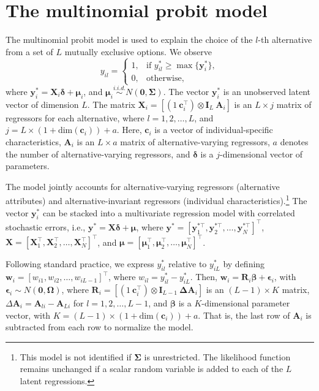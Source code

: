 \section{The multinomial probit model}\label{sec64}

The multinomial probit model is used to explain the choice of the $l$-th alternative from a set of $L$ mutually exclusive options. We observe
\begin{equation*}
	y_{il} =
	\begin{cases}
		1, & \text{if } y_{il}^* \geq \max\{\bm{y}_i^*\}, \\
		0, & \text{otherwise,}
	\end{cases}
\end{equation*}
where $\bm{y}_i^* = \bm{X}_{i}\bm{\delta} + \bm{\mu}_i$, and $\bm{\mu}_i \stackrel{i.i.d.}{\sim} N(\bm{0}, \bm{\Sigma})$. The vector $\bm{y}_i^*$ is an unobserved latent vector of dimension $L$. The matrix $\bm{X}_i = \left[(1 \ \bm{c}_i^{\top}) \otimes \bm{I}_L \ \bm{A}_i\right]$ is an $L \times j$ matrix of regressors for each alternative, where $l = 1, 2, \dots, L$, and $j = L \times (1 + \text{dim}(\bm{c}_i)) + a$. Here, $\bm{c}_i$ is a vector of individual-specific characteristics, $\bm{A}_i$ is an $L \times a$ matrix of alternative-varying regressors, $a$ denotes the number of alternative-varying regressors, and $\bm{\delta}$ is a $j$-dimensional vector of parameters.

The model jointly accounts for alternative-varying regressors (alternative attributes) and alternative-invariant regressors (individual characteristics).\footnote{This model is not identified if $\bm{\Sigma}$ is unrestricted. The likelihood function remains unchanged if a scalar random variable is added to each of the $L$ latent regressions.} The vector $\bm{y}_i^*$ can be stacked into a multivariate regression model with correlated stochastic errors, i.e., $\bm{y}^* = \bm{X}\bm{\delta} + \bm{\mu}$, where $\bm{y}^* = [\bm{y}_1^{*\top}, \bm{y}_2^{*\top}, \dots, \bm{y}_N^{*\top}]^{\top}$, $\bm{X} = [\bm{X}_1^{\top}, \bm{X}_2^{\top}, \dots, \bm{X}_N^{\top}]^{\top}$, and $\bm{\mu} = [\bm{\mu}_1^{\top}, \bm{\mu}_2^{\top}, \dots, \bm{\mu}_N^{\top}]^{\top}$.

Following standard practice, we express $y_{il}^*$ relative to $y_{iL}^*$ by defining $\bm{w}_i = [w_{i1}, w_{i2}, \dots, w_{iL-1}]^{\top}$, where $w_{il} = y_{il}^* - y_{iL}^*$. Then, $\bm{w}_i = \bm{R}_i\bm{\beta} + \bm{\epsilon}_i$, with $\bm{\epsilon}_i \sim N(\bm{0}, \bm{\Omega})$, where $\bm{R}_i = \left[(1 \ \bm{c}_i^{\top}) \otimes \bm{I}_{L-1} \ \bm{\Delta A}_i\right]$ is an $(L-1) \times K$ matrix, $\Delta\bm{A}_i = \bm{A}_{li} - \bm{A}_{Li}$ for $l = 1, 2, \dots, L-1$, and $\bm{\beta}$ is a $K$-dimensional parameter vector, with $K = (L-1) \times (1 + \text{dim}(\bm{c}_i)) + a$. That is, the last row of $\bm{A}_i$ is subtracted from each row to normalize the model.

